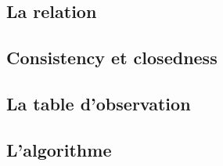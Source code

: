 \subsection{La relation \rl}
\subsection{Consistency et closedness}
\subsection{La table d'observation}
\subsection{L'algorithme}
